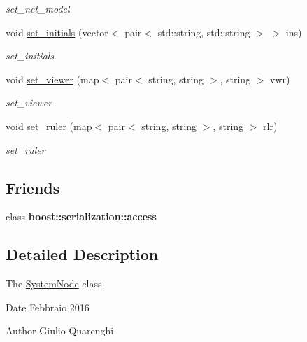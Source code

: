 \begin{DoxyCompactItemize}
\begin{DoxyCompactList}\small\item\em set\+\_\+net\+\_\+model \end{DoxyCompactList}\item 
void \hyperlink{class_system_node_a075144aaeca2f09a563b77927a94776a}{set\+\_\+initials} (vector$<$ pair$<$ std\+::string, std\+::string $>$ $>$ ins)
\begin{DoxyCompactList}\small\item\em set\+\_\+initials \end{DoxyCompactList}\item 
void \hyperlink{class_system_node_aee434f35c4d308f49306e40b59de9f2e}{set\+\_\+viewer} (map$<$ pair$<$ string, string $>$, string $>$ vwr)
\begin{DoxyCompactList}\small\item\em set\+\_\+viewer \end{DoxyCompactList}\item 
void \hyperlink{class_system_node_a13067110358b4d9e7656bc4fe05265fd}{set\+\_\+ruler} (map$<$ pair$<$ string, string $>$, string $>$ rlr)
\begin{DoxyCompactList}\small\item\em set\+\_\+ruler \end{DoxyCompactList}\end{DoxyCompactItemize}
\subsection*{Friends}
\begin{DoxyCompactItemize}
\item 
class {\bfseries boost\+::serialization\+::access}\hypertarget{class_system_node_ac98d07dd8f7b70e16ccb9a01abf56b9c}{}\label{class_system_node_ac98d07dd8f7b70e16ccb9a01abf56b9c}

\end{DoxyCompactItemize}


\subsection{Detailed Description}
The \hyperlink{class_system_node}{System\+Node} class. 

\begin{DoxyDate}{Date}
Febbraio 2016 
\end{DoxyDate}
\begin{DoxyAuthor}{Author}
Giulio Quarenghi 
\end{DoxyAuthor}


